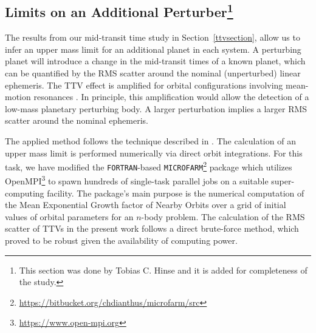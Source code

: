 \subsection{Limits on an Additional Perturber\footnote{This section was done by Tobias C. Hinse and it is added for completeness of the study.}}\label{addper}

The results from our mid-transit time study in Section~\ref{ttvsection}, allow us to infer an upper mass limit for an additional planet in each system. A perturbing planet will introduce a change in the mid-transit times of a known planet, which can be quantified by the RMS scatter around the nominal (unperturbed) linear ephemeris. The TTV effect is amplified for orbital configurations involving mean-motion resonances \citep{Agol2005, Holman2005, 2008ApJ...688..636N}. In principle, this amplification would allow the detection of a low-mass planetary perturbing body. A larger perturbation implies a larger RMS scatter around the nominal ephemeris.

The applied method follows the technique described in \citet{TEMP1,TEMP2,TEMP4}. The calculation of an upper mass limit is performed numerically via direct orbit integrations. For this task, we have modified the \texttt{FORTRAN}-based \texttt{MICROFARM}\footnote{\url{https://bitbucket.org/chdianthus/microfarm/src}}
package \citep{go2003,go2008} which utilizes OpenMPI\footnote{\url{https://www.open-mpi.org}} to spawn hundreds of single-task parallel jobs on a suitable super-computing facility. The package's main purpose is the numerical computation of the Mean Exponential Growth factor of Nearby Orbits
\citep[MEGNO]{cincsimo2000, go2001, ci2003} over a grid of initial values of orbital parameters for an $n$-body problem. The calculation of the RMS scatter of TTVs in the present work follows a direct brute-force method, which proved to be robust given the availability of computing power.

